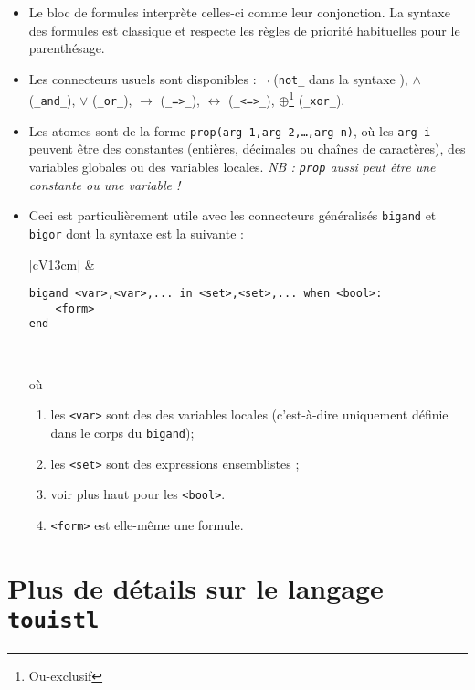 \begin{itemize}
\item Le bloc de formules interprète celles-ci comme leur conjonction. La syntaxe des formules est classique et respecte les règles de priorité habituelles pour le parenthésage. 
\item Les connecteurs usuels sont disponibles : $\lnot$ (\texttt{not\_} dans la syntaxe \touist), $\wedge$ (\texttt{\_and\_}), $\vee$ (\texttt{\_or\_}), $\rightarrow$ (\texttt{\_=>\_}), $\leftrightarrow$ (\texttt{\_<=>\_}), $\oplus$\footnote{Ou-exclusif} (\texttt{\_xor\_}). 
\item Les atomes sont de la forme \texttt{prop(arg-1,arg-2,\ldots,arg-n)}, où les \texttt{arg-i} peuvent être des constantes (entières, décimales ou chaînes de caractères), des variables globales ou des variables locales. \emph{NB : \texttt{prop} aussi peut être une constante ou une variable !}
\item Ceci est particulièrement utile avec les connecteurs généralisés \texttt{bigand} et \texttt{bigor} dont la syntaxe est la suivante : 
\begin{table}[!ht]\centering
\begin{tabular}{|cV{13cm}|} \hline
& \begin{verbatim}
bigand <var>,<var>,... in <set>,<set>,... when <bool>:
    <form>
end
\end{verbatim} \\ \hline
\end{tabular}
\end{table}
\FloatBarrier

où 
\begin{enumerate}
\item les \texttt{<var>} sont des  des variables locales (c'est-à-dire uniquement définie dans le corps du \texttt{bigand}); 
\item les \texttt{<set>} sont des expressions ensemblistes ;
\item voir plus haut pour les \texttt{<bool>}. 
\item \texttt{<form>} est elle-même une formule.
\end{enumerate}
\end{itemize}


\section{Plus de détails sur le langage \texttt{touistl}}

